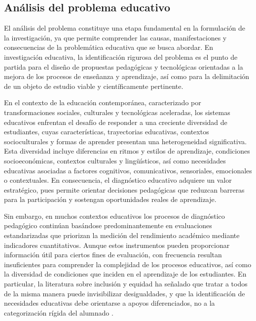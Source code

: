\begin{refsection}
\section{Análisis del problema educativo}

El análisis del problema constituye una etapa fundamental en la formulación de la investigación, ya que permite comprender las causas, manifestaciones y consecuencias de la problemática educativa que se busca abordar. En investigación educativa, la identificación rigurosa del problema es el punto de partida para el diseño de propuestas pedagógicas y tecnológicas orientadas a la mejora de los procesos de enseñanza y aprendizaje, así como para la delimitación de un objeto de estudio viable y científicamente pertinente.

En el contexto de la educación contemporánea, caracterizado por transformaciones sociales, culturales y tecnológicas aceleradas, los sistemas educativos enfrentan el desafío de responder a una creciente diversidad de estudiantes, cuyas características, trayectorias educativas, contextos socioculturales y formas de aprender presentan una heterogeneidad significativa. Esta diversidad incluye diferencias en ritmos y estilos de aprendizaje, condiciones socioeconómicas, contextos culturales y lingüísticos, así como necesidades educativas asociadas a factores cognitivos, comunicativos, sensoriales, emocionales o contextuales. En consecuencia, el diagnóstico educativo adquiere un valor estratégico, pues permite orientar decisiones pedagógicas que reduzcan barreras para la participación y sostengan oportunidades reales de aprendizaje.

Sin embargo, en muchos contextos educativos los procesos de diagnóstico pedagógico continúan basándose predominantemente en evaluaciones estandarizadas que priorizan la medición del rendimiento académico mediante indicadores cuantitativos. Aunque estos instrumentos pueden proporcionar información útil para ciertos fines de evaluación, con frecuencia resultan insuficientes para comprender la complejidad de los procesos educativos, así como la diversidad de condiciones que inciden en el aprendizaje de los estudiantes. En particular, la literatura sobre inclusión y equidad ha señalado que tratar a todos de la misma manera puede invisibilizar desigualdades, y que la identificación de necesidades educativas debe orientarse a apoyos diferenciados, no a la categorización rígida del alumnado \parencite{unesco2020}.


\end{refsection}
